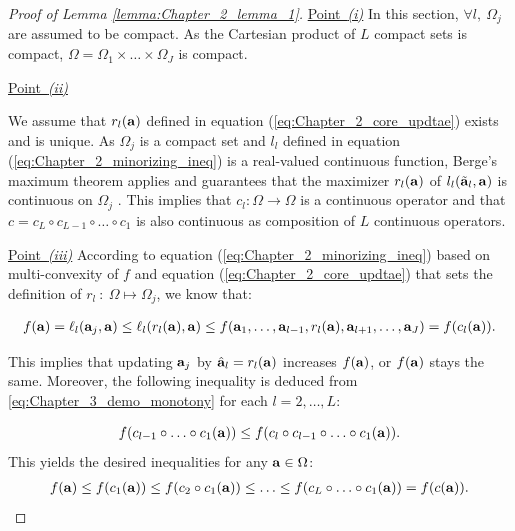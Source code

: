 \documentclass[
]{jss}
\begin{document}
\begin{proof}[Proof of Lemma \ref{lemma:Chapter_2_lemma_1}]

    \underline{Point~\textit{(i)}} In this section, $\forall l, ~ \Omega_j$ are assumed to be compact. As the Cartesian product of $L$ compact sets is compact, $\Omega = \Omega_1\times \ldots \times\Omega_J$ is compact.


    \underline{Point~\textit{(ii)}} 

    We assume that $r_l(\mathbf{a})$ defined in equation (\ref{eq:Chapter_2_core_updtae}) exists and is unique. As $\Omega_j$ is a compact set and $l_l$ defined in equation (\ref{eq:Chapter_2_minorizing_ineq}) is a real-valued continuous function, Berge's maximum theorem applies and guarantees that the maximizer $r_l(\mathbf{a})$ of $l_l(\tilde {\mathbf{a}}_l, \mathbf{a})$ is continuous on $\Omega_j$ \citep{Berge1966}. This implies that $c_l: \Omega \to \Omega$ is a continuous operator and that  $c = c_L \circ c_{L-1} \circ \ldots \circ c_1$ is also continuous as composition of $L$ continuous operators.

    \underline{Point~\textit{(iii)}} According to equation (\ref{eq:Chapter_2_minorizing_ineq}) based on multi-convexity of $f$ and equation (\ref{eq:Chapter_2_core_updtae}) that sets the definition of $r_l~:~\Omega\mapsto\Omega_j$, we know that:

    \begin{equation}
        \begin{gathered}
            f(\mathbf{a}) = \ell_l(\mathbf{a}_j, \mathbf{a})\leq\ell_l(r_l(\mathbf{a}), \mathbf{a})\leq f(\mathbf{a}_1, \ldots, \mathbf{a}_{l-1}, r_l(\mathbf{a}), \mathbf{a}_{l+1}, \ldots, \mathbf{a}_J) = f(c_l(\mathbf{a})).
        \label{eq:Chapter_3_demo_monotony}
        \end{gathered}
    \end{equation}

    This implies that updating $\mathbf{a}_j$ by $\hat{\mathbf{a}}_l = r_l(\mathbf{a})$ increases $f(\mathbf{a})$, or $f(\mathbf{a})$ stays the same. Moreover, the following inequality is deduced from \eqref{eq:Chapter_3_demo_monotony} for each $l = 2, \ldots, L$:

    \begin{equation}
        f(c_{l-1}\circ\ldots\circ c_1(\mathbf{a}))\leq f(c_l\circ c_{l-1}\circ\ldots\circ c_1(\mathbf{a})).
    \end{equation}
    This yields the desired inequalities for any $\mathbf{a}\in\Omega$:
    \begin{equation}
        \begin{gathered}
            f(\mathbf{a})\leq f(c_1(\mathbf{a}))\leq f(c_2\circ c_1(\mathbf{a}))\leq\ldots\leq f(c_L\circ\ldots\circ c_1(\mathbf{a})) = f(c(\mathbf{a})).
        \end{gathered}
    \label{eq:Chapter_3_demo_point3_end}
    \end{equation}


\end{proof}
\end{document}
